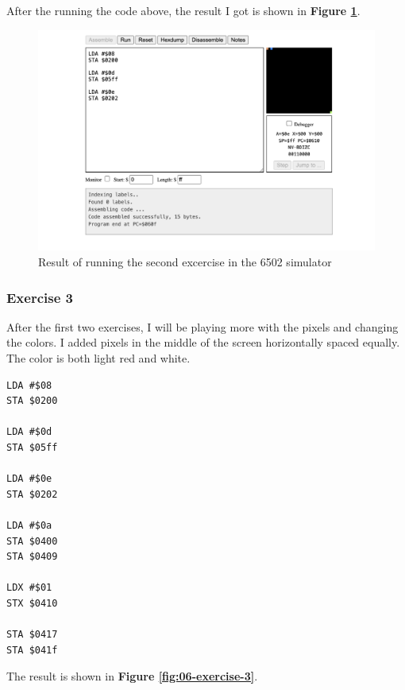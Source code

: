 \documentclass[a4paper]{article}
\begin{document}
After the running the code above, the result I got is shown in \textbf{Figure \ref{fig:05-exercise-2}}.

\begin{figure}[H]
    \centering
    \includegraphics[width=1.0\textwidth]{res/images/q2/05-exercise-2.png}
    \caption{Result of running the second excercise in the 6502 simulator}
    \label{fig:05-exercise-2}
\end{figure}

\subsubsection{Exercise 3}

After the first two exercises, I will be playing more with the pixels and changing the colors. I added pixels in the middle of the screen horizontally spaced equally. The color is both light red and white.

\begin{lstlisting}[style=6502asm]
LDA #$08
STA $0200

LDA #$0d
STA $05ff

LDA #$0e
STA $0202

LDA #$0a
STA $0400
STA $0409

LDX #$01
STX $0410 

STA $0417
STA $041f
\end{lstlisting}

The result is shown in  \textbf{Figure \ref{fig:06-exercise-3}}.
\end{document}
